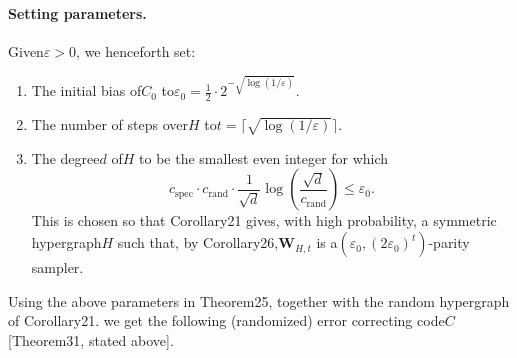 \documentclass[10pt,a4paper]{article}
\begin{document}
\paragraph{Setting parameters.} Given$\varepsilon>0$, we henceforth set:
\begin{enumerate}
\item The initial bias of$C_0$ to$\varepsilon_0=\frac12\cdot2^{-\sqrt{\log(1/\varepsilon)}}$.
\item The number of steps over$H$ to$t=\lceil\sqrt{\log(1/\varepsilon)}\rceil$.
\item The degree$d$ of$H$ to be the smallest even integer for which
\[c_{\mathrm{spec}}\cdot c_{\mathrm{rand}}\cdot\frac1{\sqrt d}\log\left(\frac{\sqrt d}{c_{\mathrm{rand}}}\right)\leq\varepsilon_0.\]
This is chosen so that Corollary21 gives, with high probability, a symmetric hypergraph$H$ such that, by Corollary26,$\mathbf W_{H,t}$ is a$(\varepsilon_0,(2\varepsilon_0)^t)$-parity sampler.
\end{enumerate}
Using the above parameters in Theorem25, together with the random hypergraph of Corollary21. we get the following (randomized) error correcting code$C$ [Theorem31, stated above].
\end{document}
